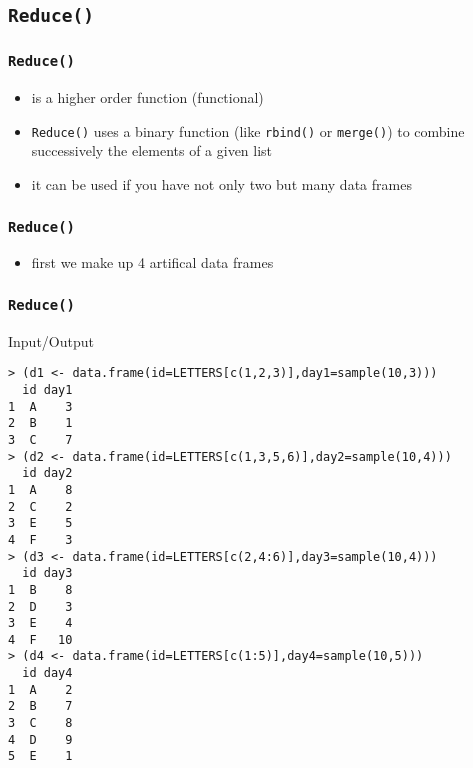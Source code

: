 \documentclass[xcolor={table},c]{beamer}
\begin{document}
\subsection{\texttt{Reduce()}}
\begin{frame}[fragile]\frametitle{\texttt{Reduce()}}
\begin{itemize}
\item is a higher order function (functional)
\item \texttt{Reduce()} uses a binary function (like \texttt{rbind()} or \texttt{merge()}) to combine successively the elements of a given list
\item it can be used if you have not only two but many data frames
\end{itemize}
\end{frame}


\begin{frame}[fragile]\frametitle{\texttt{Reduce()}}
  \begin{itemize}
  \item first we make up 4 artifical data frames
  \end{itemize}
\end{frame}


\begin{frame}[fragile]\frametitle{\texttt{Reduce()}}
  \begin{exampleblock}{Input/Output}\tiny
\begin{verbatim}
> (d1 <- data.frame(id=LETTERS[c(1,2,3)],day1=sample(10,3)))
  id day1
1  A    3
2  B    1
3  C    7
> (d2 <- data.frame(id=LETTERS[c(1,3,5,6)],day2=sample(10,4)))
  id day2
1  A    8
2  C    2
3  E    5
4  F    3
> (d3 <- data.frame(id=LETTERS[c(2,4:6)],day3=sample(10,4)))
  id day3
1  B    8
2  D    3
3  E    4
4  F   10
> (d4 <- data.frame(id=LETTERS[c(1:5)],day4=sample(10,5)))
  id day4
1  A    2
2  B    7
3  C    8
4  D    9
5  E    1
\end{verbatim}
  \end{exampleblock}
\end{frame}
\end{document}
